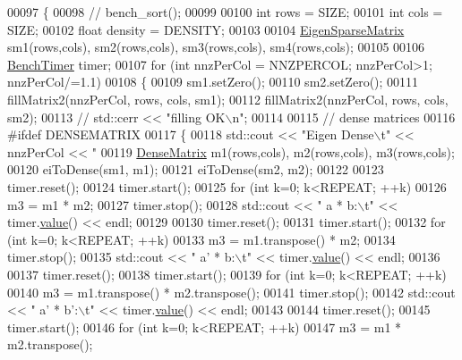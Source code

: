 \begin{DoxyCode}
00097 \{
00098 \textcolor{comment}{//   bench\_sort();}
00099 
00100   \textcolor{keywordtype}{int} rows = SIZE;
00101   \textcolor{keywordtype}{int} cols = SIZE;
00102   \textcolor{keywordtype}{float} density = DENSITY;
00103 
00104   \hyperlink{group___sparse_core___module}{EigenSparseMatrix} sm1(rows,cols), sm2(rows,cols), sm3(rows,cols), sm4(rows,cols);
00105 
00106   \hyperlink{class_eigen_1_1_bench_timer}{BenchTimer} timer;
00107   \textcolor{keywordflow}{for} (\textcolor{keywordtype}{int} nnzPerCol = NNZPERCOL; nnzPerCol>1; nnzPerCol/=1.1)
00108   \{
00109     sm1.setZero();
00110     sm2.setZero();
00111     fillMatrix2(nnzPerCol, rows, cols, sm1);
00112     fillMatrix2(nnzPerCol, rows, cols, sm2);
00113 \textcolor{comment}{//     std::cerr << "filling OK\(\backslash\)n";}
00114 
00115     \textcolor{comment}{// dense matrices}
00116 \textcolor{preprocessor}{    #ifdef DENSEMATRIX}
00117     \{
00118       std::cout << \textcolor{stringliteral}{"Eigen Dense\(\backslash\)t"} << nnzPerCol << \textcolor{stringliteral}{"%
00119       \hyperlink{group___core___module}{DenseMatrix} m1(rows,cols), m2(rows,cols), m3(rows,cols);
00120       eiToDense(sm1, m1);
00121       eiToDense(sm2, m2);
00122 
00123       timer.reset();
00124       timer.start();
00125       \textcolor{keywordflow}{for} (\textcolor{keywordtype}{int} k=0; k<REPEAT; ++k)
00126         m3 = m1 * m2;
00127       timer.stop();
00128       std::cout << \textcolor{stringliteral}{"   a * b:\(\backslash\)t"} << timer.\hyperlink{class_eigen_1_1_bench_timer_a26760f963ed8b64c126159bfea57735e}{value}() << endl;
00129 
00130       timer.reset();
00131       timer.start();
00132       \textcolor{keywordflow}{for} (\textcolor{keywordtype}{int} k=0; k<REPEAT; ++k)
00133         m3 = m1.transpose() * m2;
00134       timer.stop();
00135       std::cout << \textcolor{stringliteral}{"   a' * b:\(\backslash\)t"} << timer.\hyperlink{class_eigen_1_1_bench_timer_a26760f963ed8b64c126159bfea57735e}{value}() << endl;
00136 
00137       timer.reset();
00138       timer.start();
00139       \textcolor{keywordflow}{for} (\textcolor{keywordtype}{int} k=0; k<REPEAT; ++k)
00140         m3 = m1.transpose() * m2.transpose();
00141       timer.stop();
00142       std::cout << \textcolor{stringliteral}{"   a' * b':\(\backslash\)t"} << timer.\hyperlink{class_eigen_1_1_bench_timer_a26760f963ed8b64c126159bfea57735e}{value}() << endl;
00143 
00144       timer.reset();
00145       timer.start();
00146       \textcolor{keywordflow}{for} (\textcolor{keywordtype}{int} k=0; k<REPEAT; ++k)
00147         m3 = m1 * m2.transpose();
}
\end{DoxyCode}
